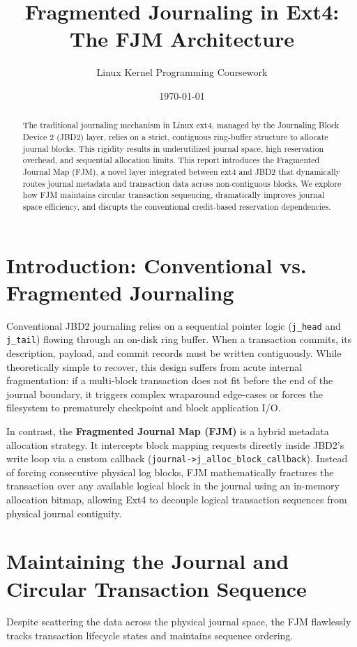 \documentclass{article}
\title{\textbf{Fragmented Journaling in Ext4: The FJM Architecture}}
\author{Linux Kernel Programming Coursework}
\date{\today}
\begin{document}
\maketitle

\begin{abstract}
The traditional journaling mechanism in Linux ext4, managed by the Journaling Block Device 2 (JBD2) layer, relies on a strict, contiguous ring-buffer structure to allocate journal blocks. This rigidity results in underutilized journal space, high reservation overhead, and sequential allocation limits. This report introduces the Fragmented Journal Map (FJM), a novel layer integrated between ext4 and JBD2 that dynamically routes journal metadata and transaction data across non-contiguous blocks. We explore how FJM maintains circular transaction sequencing, dramatically improves journal space efficiency, and disrupts the conventional credit-based reservation dependencies.
\end{abstract}

\section{Introduction: Conventional vs. Fragmented Journaling}
Conventional JBD2 journaling relies on a sequential pointer logic (\texttt{j\_head} and \texttt{j\_tail}) flowing through an on-disk ring buffer. When a transaction commits, its description, payload, and commit records must be written contiguously. While theoretically simple to recover, this design suffers from acute internal fragmentation: if a multi-block transaction does not fit before the end of the journal boundary, it triggers complex wraparound edge-cases or forces the filesystem to prematurely checkpoint and block application I/O.

In contrast, the \textbf{Fragmented Journal Map (FJM)} is a hybrid metadata allocation strategy. It intercepts block mapping requests directly inside JBD2's write loop via a custom callback (\texttt{journal->j\_alloc\_block\_callback}). Instead of forcing consecutive physical log blocks, FJM mathematically fractures the transaction over any available logical block in the journal using an in-memory allocation bitmap, allowing Ext4 to decouple logical transaction sequences from physical journal contiguity.

\section{Maintaining the Journal and Circular Transaction Sequence}
Despite scattering the data across the physical journal space, the FJM flawlessly tracks transaction lifecycle states and maintains sequence ordering. 
\end{document}
